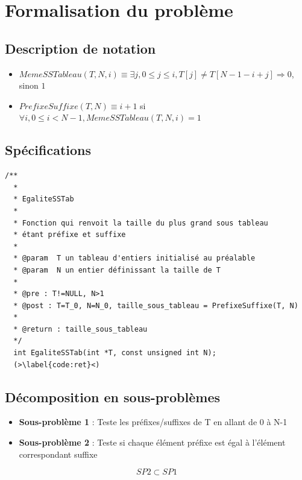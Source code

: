 \documentclass[a4paper, 11pt, oneside]{article}
\begin{document}
\section{Formalisation du problème}

\subsection{Description de notation}
  \begin{itemize}
  \item $MemeSSTableau(T,N,i)\equiv \exists j, 0\leq j\leq i, T[j]\neq T[N-1-i+j]\Rightarrow 0$, sinon $1$
  \item $PrefixeSuffixe(T,N)\equiv i+1$ si $\forall i, 0\leq i< N-1, MemeSSTableau(T, N, i)=1$
  \end{itemize}
\newpage
\subsection{Spécifications}

\begin{lstlisting}[caption={Spécification fonction EgaliteSSTab}]
  /**
  *
  * EgaliteSSTab
  *
  * Fonction qui renvoit la taille du plus grand sous tableau 
  * étant préfixe et suffixe
  *
  * @param  T un tableau d'entiers initialisé au préalable
  * @param  N un entier définissant la taille de T
  *
  * @pre : T!=NULL, N>1
  * @post : T=T_0, N=N_0, taille_sous_tableau = PrefixeSuffixe(T, N)
  *
  * @return : taille_sous_tableau
  */
  int EgaliteSSTab(int *T, const unsigned int N);
  (>\label{code:ret}<)
\end{lstlisting}

\subsection{Décomposition en sous-problèmes}
\begin{itemize}
  \item \textbf{Sous-problème 1} : Teste les préfixes/suffixes de T
en allant de 0 à N-1
  \item \textbf{Sous-problème 2} : Teste si chaque élément préfixe
est égal à l'élément correspondant suffixe 
\end{itemize}
$$SP2\subset SP1$$
\end{document}
